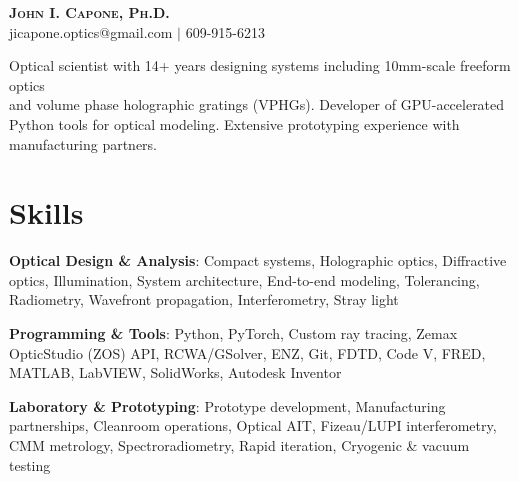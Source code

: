 \documentclass[letterpaper,11pt]{article}
\begin{document}
\begin{center}
    \textbf{\Huge \scshape John I. Capone, Ph.D.} \\ \vspace{1pt}
    \small jicapone.optics@gmail.com $|$ 609-915-6213\\ \vspace{2pt}
\end{center}

\begin{adjustwidth}{50pt}{50pt}
\raggedright
\small Optical scientist with 14+ years designing systems including 10mm-scale freeform optics\\
and volume phase holographic gratings (VPHGs). Developer of GPU-accelerated Python tools for optical modeling. Extensive prototyping experience with manufacturing partners.
\end{adjustwidth}

\section{Skills}
\begin{itemize}[leftmargin=0.15in, label={}]
    \small{
        \item\begin{minipage}[t]{\linewidth}
            \textbf{Optical Design \& Analysis}: \hangindent=50pt  Compact systems, Holographic optics, Diffractive optics, Illumination, System architecture, End-to-end modeling, Tolerancing, Radiometry, Wavefront propagation, Interferometry, Stray light
        \end{minipage}
        \item\begin{minipage}[t]{\linewidth}
            \textbf{Programming \& Tools}: \hangindent=50pt  Python, PyTorch, Custom ray tracing, Zemax OpticStudio (ZOS) API, RCWA/GSolver, ENZ, Git, FDTD, Code V, FRED, MATLAB, LabVIEW, SolidWorks, Autodesk Inventor
        \end{minipage}
        \item\begin{minipage}[t]{\linewidth}
            \textbf{Laboratory \& Prototyping}: \hangindent=50pt  Prototype development, Manufacturing partnerships, Cleanroom operations, Optical AIT, Fizeau/LUPI interferometry, CMM metrology, Spectroradiometry, Rapid iteration, Cryogenic \& vacuum testing
        \end{minipage}
    }
\end{itemize}
\end{document}
